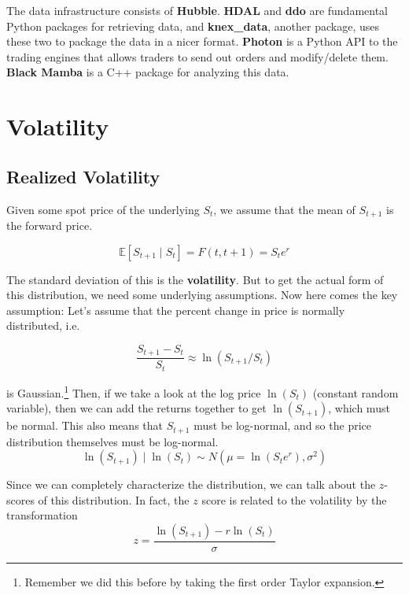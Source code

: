 \documentclass{article}
\begin{document}
    The data infrastructure consists of \textbf{Hubble}. \textbf{HDAL} and \textbf{ddo} are fundamental Python packages for retrieving data, and \textbf{knex\_data}, another package, uses these two to package the data in a nicer format. \textbf{Photon} is a Python API to the trading engines that allows traders to send out orders and modify/delete them. \textbf{Black Mamba} is a C++ package for analyzing this data.

\section{Volatility}

  \subsection{Realized Volatility}

    Given some spot price of the underlying $S_t$, we assume that the mean of $S_{t + 1}$ is the forward price. 

    \begin{equation}
      \mathbb{E}[S_{t+1} \mid S_t] = F(t, t+1) = S_t e^{r} 
    \end{equation} 

    The standard deviation of this is the \textbf{volatility}. But to get the actual form of this distribution, we need some underlying assumptions. Now here comes the key assumption: Let's assume that the percent change in price is normally distributed, i.e. 

    \begin{equation}
      \frac{S_{t + 1} - S_t}{S_t} \approx \ln(S_{t + 1} / S_t) 
    \end{equation}

    is Gaussian.\footnote{Remember we did this before by taking the first order Taylor expansion.} Then, if we take a look at the log price $\ln(S_t)$ (constant random variable), then we can add the returns together to get $\ln(S_{t + 1})$, which must be normal. This also means that $S_{t+1}$ must be log-normal, and so the price distribution themselves must be log-normal. 
    \begin{equation}
      \ln(S_{t + 1}) \mid \ln(S_t) \sim N(\mu = \ln(S_t e^r), \sigma^2)
    \end{equation}

    Since we can completely characterize the distribution, we can talk about the $z$-scores of this distribution. In fact, the $z$ score is related to the volatility by the transformation 
    \begin{equation}
      z = \frac{\ln(S_{t + 1}) - r \ln(S_t)}{\sigma}
    \end{equation}
\end{document}
